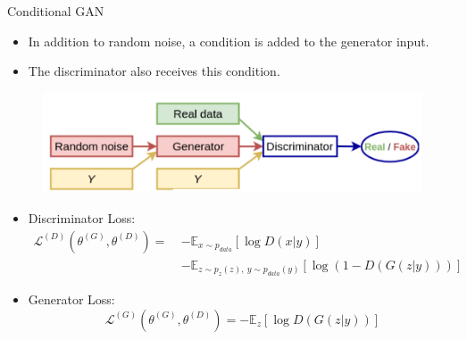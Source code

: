 \begin{frame}[allowframebreaks]{Conditional GAN}
\begin{itemize}
    \item In addition to random noise, a condition is added to the generator input. 
    \item The discriminator also receives this condition.
\end{itemize}
\begin{figure}
    \centering
    \includegraphics[height=0.8\textheight, width=\textwidth, keepaspectratio]{images/gan/cond_gan_1.png}
\end{figure}

\framebreak
\begin{itemize}
    \item Discriminator Loss:
    \begin{align*}
    \mathcal{L}^{(D)} \left( \theta^{(G)}, \theta^{(D)} \right) =\ & 
    - \mathbb{E}_{x \sim p_{data}} \left[ \log D(x|y) \right] \\
    & - \mathbb{E}_{z \sim p_z(z),\ y \sim p_{data}(y)} \left[ \log(1 - D(G(z|y))) \right]
    \end{align*}
    \item Generator Loss:
    $$
    \mathcal{L}^{(G)} \left( \theta^{(G)}, \theta^{(D)} \right) = - \mathbb{E}_z \left[ \log D(G(z|y)) \right]
    $$
\end{itemize}


\end{frame}
